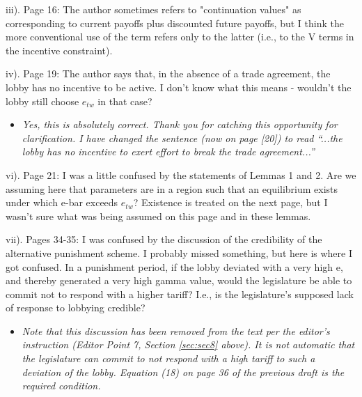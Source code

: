 \documentclass[12pt]{article}
\begin{document}
iii). Page 16: The author sometimes refers to "continuation values" as corresponding to current payoffs plus discounted future payoffs, but I think the more conventional use of the term refers only to the latter (i.e., to the V terms in the incentive constraint).

iv). Page 19: The author says that, in the absence of a trade agreement, the lobby has no incentive to be active. I don't know what this means - wouldn't the lobby still choose $e_{tw}$ in that case?
\begin{itemize}
\renewcommand\labelitemi{-}
	\item \textit{Yes, this is absolutely correct. Thank you for catching this opportunity for clarification. I have changed the sentence (now on page [20]) to read ``...the lobby has no incentive to exert effort to break the trade agreement...''}
\end{itemize}

vi). Page 21: I was a little confused by the statements of Lemmas 1 and 2. Are we assuming here that parameters are in a region such that an equilibrium exists under which e-bar exceeds $e_{tw}$? Existence is treated on the next page, but I wasn't sure what was being assumed on this page and in these lemmas.

vii). Pages 34-35: I was confused by the discussion of the credibility of the alternative punishment scheme. I probably missed something, but here is where I got confused. In a punishment period, if the lobby deviated with a very high e, and thereby generated a very high gamma value, would the legislature be able to commit not to respond with a higher tariff? I.e., is the legislature's supposed lack of response to lobbying credible?
\begin{itemize}
\renewcommand\labelitemi{-}
	\item \textit{Note that this discussion has been removed from the text per the editor's instruction (Editor Point 7, Section \ref{sec:sec8} above). It is not automatic that the legislature can commit to not respond with a high tariff to such a deviation of the lobby. Equation (18) on page 36 of the previous draft is the required condition.}
\end{itemize}
\end{document}
